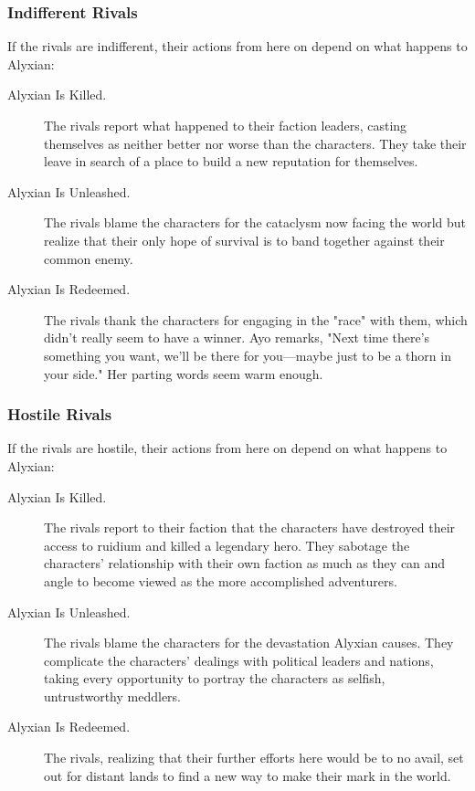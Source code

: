 \documentclass[10pt,a4paper,twoside,fancy,bg=print,twocolumn,openany,nodeprecatedcode]{dndbook}
\begin{document}
\subsubsection{Indifferent Rivals}
If the rivals are indifferent, their actions from here on depend on what happens to Alyxian:


\begin{description}
\item[Alyxian Is Killed.]
The rivals report what happened to their faction leaders, casting themselves as neither better nor worse than the characters. They take their leave in search of a place to build a new reputation for themselves.
\item[Alyxian Is Unleashed.]
The rivals blame the characters for the cataclysm now facing the world but realize that their only hope of survival is to band together against their common enemy.
\item[Alyxian Is Redeemed.]
The rivals thank the characters for engaging in the "race" with them, which didn't really seem to have a winner. Ayo remarks, "Next time there's something you want, we'll be there for you—maybe just to be a thorn in your side." Her parting words seem warm enough.
\end{description}

\subsubsection{Hostile Rivals}
If the rivals are hostile, their actions from here on depend on what happens to Alyxian:


\begin{description}
\item[Alyxian Is Killed.]
The rivals report to their faction that the characters have destroyed their access to ruidium and killed a legendary hero. They sabotage the characters' relationship with their own faction as much as they can and angle to become viewed as the more accomplished adventurers.
\item[Alyxian Is Unleashed.]
The rivals blame the characters for the devastation Alyxian causes. They complicate the characters' dealings with political leaders and nations, taking every opportunity to portray the characters as selfish, untrustworthy meddlers.
\item[Alyxian Is Redeemed.]
The rivals, realizing that their further efforts here would be to no avail, set out for distant lands to find a new way to make their mark in the world.
\end{description}
\end{document}
